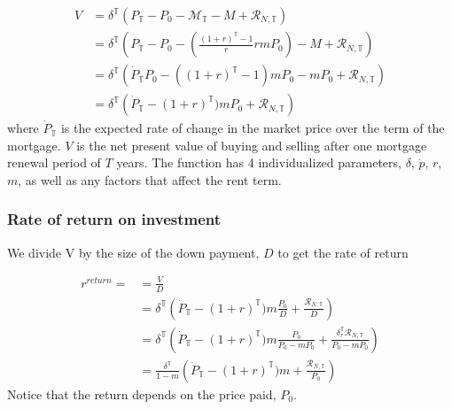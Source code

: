 { \begin{align}
V &= \delta^\mathbb{T}\left( P_\mathbb{T}-P_0-\mathcal{M}_{\mathbb{T}}- M+ \mathcal{R}_{N, \mathbb{T}} \right)      \nonumber\\
&= \delta^\mathbb{T}\left( P_\mathbb{T}-P_0- \left(\frac{(1+r)^\mathbb{T}-1}{r}rmP_0\right)- M+ \mathcal{R}_{N, \mathbb{T}} \right)      \nonumber\\
&= \delta^\mathbb{T} \left(
\dot P_\mathbb{T} P_0 -\left((1+r)^\mathbb{T}-1\right)mP_0-mP_0
 +  \mathcal{R}_{N, \mathbb{T}} \right) 
\label{first_sub}\nonumber\\
  &= \delta^\mathbb{T} \left(\dot P_\mathbb{T} - (1+r)^\mathbb{T})m P_0 + \mathcal{R}_{N, \mathbb{T}}\right)
\end{align}
where $\dot P_\mathbb{T}$  is the expected rate of change in the market price over the term of the mortgage.
$V$ is the net present value of buying and selling after one mortgage renewal period of $T$ years. %
The function has 4 individualized  parameters, $\delta$, $\dot p$, $r$, $m$, as well as any factors that affect the rent term.


\subsubsection{Rate of return on investment}
We divide V by the size of the down payment, $D$ to get the  rate of return  

\begin{align}
r^{return} =
  &= \frac{V}{D}  \nonumber \\
  &= \delta^\mathbb{T} \left(\dot P_\mathbb{T} - (1+r)^\mathbb{T})m \frac{P_0}{D} + \frac{\mathcal{R}_{N, \mathbb{T}}}{D}\right)\\
  &= \delta^\mathbb{T} \left(\dot P_\mathbb{T} - (1+r)^\mathbb{T})m \frac{P_0}{P_0-mP_0} + \frac{\delta_r^\mathbb{T}\mathcal{R}_{N, \mathbb{T}}}{P_0-mP_0}\right)\\  
  &= \frac{\delta^\mathbb{T}}{1-m} \left(\dot P_\mathbb{T} - (1+r)^\mathbb{T})m  + \frac{\mathcal{R}_{N, \mathbb{T}}}{P_0}\right)\label{eqn-property-investment-return1} 
\end{align}
Notice that the return depends on the price paid, $P_0$.


}
